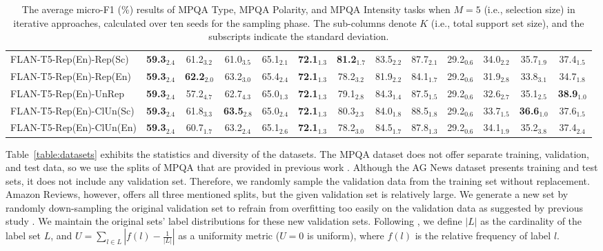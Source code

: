 \documentclass[11pt]{article}
\theoremstyle{definition}
\begin{document}
\begin{table*}[hbt]
{\begin{tabular}{l|cccc|cccc|cccc}
FLAN-T5-Rep(En)-Rep(Sc) &
\textbf{59.3}$_{2.4}$ & 61.2$_{3.2}$ & 61.0$_{3.5}$ & 65.1$_{2.1}$ &
\textbf{72.1}$_{1.3}$ & \textbf{81.2}$_{1.7}$ & 83.5$_{2.2}$ & 87.7$_{2.1}$ &
29.2$_{0.6}$ & 34.0$_{2.2}$ & 35.7$_{1.9}$ & 37.4$_{1.5}$ \\

FLAN-T5-Rep(En)-Rep(En) &
\textbf{59.3}$_{2.4}$ & \textbf{62.2}$_{2.0}$ & 63.2$_{3.0}$ & 65.4$_{2.4}$ &
\textbf{72.1}$_{1.3}$ & 78.2$_{3.2}$ & 81.9$_{2.2}$ & 84.1$_{1.7}$ &
29.2$_{0.6}$ & 31.9$_{2.8}$ & 33.8$_{3.1}$ & 34.7$_{1.8}$ \\

FLAN-T5-Rep(En)-UnRep &
\textbf{59.3}$_{2.4}$ & 57.2$_{4.7}$ & 62.7$_{4.3}$ & 65.0$_{1.3}$ &
\textbf{72.1}$_{1.3}$ & 79.1$_{2.8}$ & 84.3$_{1.4}$ & 87.5$_{1.5}$ &
29.2$_{0.6}$ & 32.6$_{2.7}$ & 35.1$_{2.5}$ & \textbf{38.9}$_{1.0}$ \\

FLAN-T5-Rep(En)-ClUn(Sc) &
\textbf{59.3}$_{2.4}$ & 61.8$_{3.3}$ & \textbf{63.5}$_{2.8}$ & 65.0$_{2.4}$ &
\textbf{72.1}$_{1.3}$ & 80.3$_{2.3}$ & 84.0$_{1.8}$ & 88.5$_{1.8}$ &
29.2$_{0.6}$ & 33.7$_{1.5}$ & \textbf{36.6}$_{1.0}$ & 37.6$_{1.5}$ \\

FLAN-T5-Rep(En)-ClUn(En) &
\textbf{59.3}$_{2.4}$ & 60.7$_{1.7}$ & 63.2$_{2.4}$ & 65.1$_{2.6}$ &
\textbf{72.1}$_{1.3}$ & 78.2$_{3.0}$ & 84.5$_{1.7}$ & 87.8$_{1.3}$ &
29.2$_{0.6}$ & 34.1$_{1.9}$ & 35.2$_{3.8}$ & 37.4$_{2.4}$ \\

\hline
\end{tabular}
}
\caption{The average micro-F1 (\%) results of MPQA Type, MPQA Polarity, and MPQA Intensity tasks when $M=5$ (i.e., selection size) in iterative approaches, calculated over ten seeds for the sampling phase. The sub-columns denote $K$ (i.e., total support set size), and the subscripts indicate the standard deviation.}
\label{table:afl-complete-5}
\end{table*}


Table~\ref{table:datasets} exhibits the statistics and diversity of the datasets.
The MPQA dataset does not offer separate training, validation, and test data, so we use the splits of MPQA that are provided in previous work \cite{ahmadnia-etal-2024-opinion}.
Although the AG News dataset presents training and test sets, it does not include any validation set. Therefore, we randomly sample the validation data from the training set without replacement.
Amazon Reviews, however, offers all three mentioned splits, but the given validation set is relatively large. We generate a new set by randomly down-sampling the original validation set to refrain from overfitting too easily on the validation data as suggested by previous study \cite{gunel2020supervised}. We maintain the original sets' label distributions for these new validation sets. Following \citet{muller2022active}, we define $|L|$ as the cardinality of the label set $L$, and $U=\sum_{l\in L}|f(l)- \frac{1}{|L|}|$ as a uniformity metric ($U=0$ is uniform), where $f(l)$ is the relative frequency of label $l$.
\end{document}
